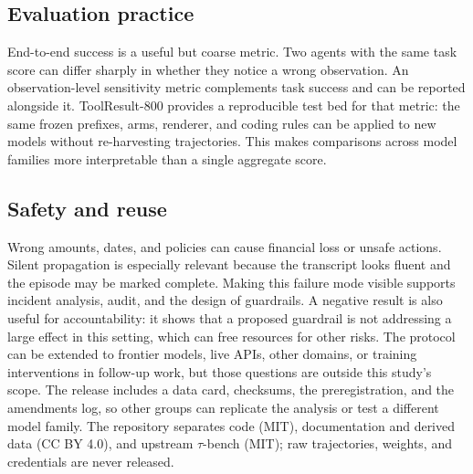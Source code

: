 \documentclass[11pt,a4paper]{article}
\begin{document}
\subsection{Evaluation practice}
End-to-end success is a useful but coarse metric. Two agents with the same task score can differ
sharply in whether they notice a wrong observation. An observation-level sensitivity metric
complements task success and can be reported alongside it. ToolResult-800 provides a reproducible test bed
for that metric: the same frozen prefixes, arms, renderer, and coding rules can be applied to new
models without re-harvesting trajectories. This makes comparisons across model families more
interpretable than a single aggregate score.

\subsection{Safety and reuse}
Wrong amounts, dates, and policies can cause financial loss or unsafe actions. Silent propagation
is especially relevant because the transcript looks fluent and the episode may be marked complete.
Making this failure mode visible supports incident analysis, audit, and the design of guardrails. A
negative result is also useful for accountability: it shows that a proposed guardrail is not
addressing a large effect in this setting, which can free resources for other risks. The protocol can be extended to frontier models, live APIs, other domains, or training
interventions in follow-up work, but those questions are outside this study's scope. The release
includes a data card, checksums, the preregistration, and the amendments log, so other groups can
replicate the analysis or test a different model family. The repository separates code (MIT),
documentation and derived data (CC BY 4.0), and upstream $\tau$-bench (MIT); raw trajectories,
weights, and credentials are never released.
\end{document}
